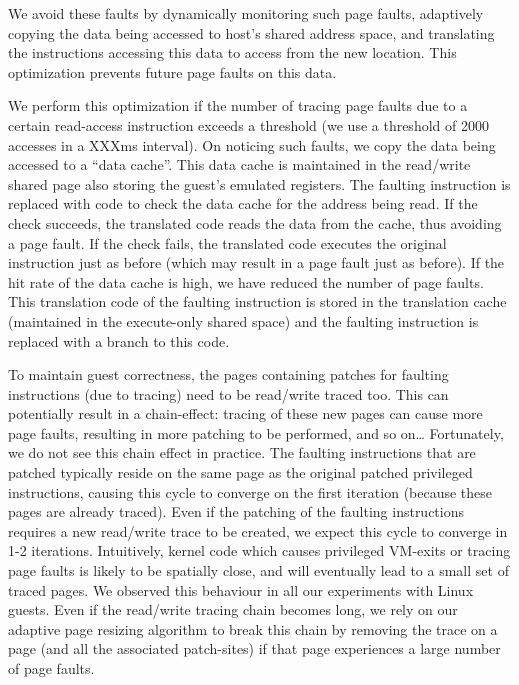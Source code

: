\documentclass[10pt,twocolumn]{article}
\begin{document}
We avoid these faults by dynamically monitoring such page faults, adaptively
copying the data being accessed to host's shared address space, and
translating the instructions accessing this data to access from the new location.
This optimization prevents future page faults on this data.

We perform this optimization if the number of tracing page faults
due to a certain read-access instruction exceeds a threshold (we use a threshold
of 2000 accesses in a XXXms interval). On noticing
such faults, we copy the data being accessed
to a ``data cache''. This data cache is maintained in the read/write shared page
also storing the guest's emulated registers.
The faulting instruction is replaced with
code to check the data cache for the address being read. If the check succeeds, the
translated code reads the data from the cache, thus avoiding a page fault.
If the check fails, the translated code executes the original
instruction just as before (which may result in a page fault just as before).
If the hit rate of the data cache is high, we have reduced the number of page faults.
This translation code of the faulting instruction is stored in the translation
cache (maintained in the execute-only shared space) and the faulting
instruction is replaced with a branch to this code.

To maintain guest correctness, the pages containing patches for
faulting instructions (due to tracing) need to be read/write traced too.
This can potentially result in a chain-effect: tracing of these new pages
can cause more page faults, resulting in more patching to be performed, and so on\ldots
Fortunately, we do not see this chain effect in practice. The faulting instructions
that are patched typically reside on the same
page as the original patched privileged instructions, causing this
cycle to converge on the first iteration (because these pages are already traced).
Even if the patching of the faulting instructions requires a new read/write trace to be
created, we expect this
cycle to converge in 1-2 iterations. Intuitively, kernel
code which causes privileged
VM-exits or tracing page faults is likely to be spatially close, and will eventually
lead to a small set of traced pages. We observed this behaviour in all our experiments
with Linux guests. Even if the read/write tracing chain becomes long, we rely on
our adaptive page resizing algorithm to break this chain by removing the
trace on a page (and all the associated patch-sites)
if that page experiences a large number of page faults.
\end{document}
